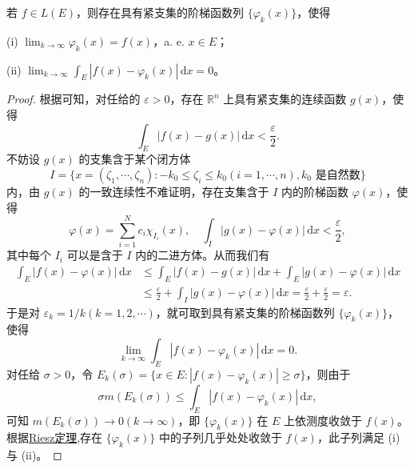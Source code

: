 \documentclass[../../main.tex]{subfiles}
\begin{document}
\begin{corollary}\label{corollary:推论4.22}
若 \( f \in L(E) \)，则存在具有紧支集的阶梯函数列 \( \{\varphi_k(x)\} \)，使得

(i) \( \lim_{k \to \infty} \varphi_k(x) = f(x) \)，a. e. \( x \in E \)；

(ii) \( \lim_{k \to \infty} \int_E |f(x) - \varphi_k(x)| \, \mathrm{d}x = 0 \)。
\end{corollary}
\begin{proof}
根据可知，对任给的 \( \varepsilon > 0 \)，存在 \( \mathbb{R}^n \) 上具有紧支集的连续函数 \( g(x) \)，使得
\[
\int_E |f(x) - g(x)| \, \mathrm{d}x < \frac{\varepsilon}{2}.
\]
不妨设 \( g(x) \) 的支集含于某个闭方体
\[
I = \{ x = (\zeta_1, \cdots, \zeta_n) : -k_0 \leqslant \zeta_i \leqslant k_0 (i = 1, \cdots, n), k_0 \text{ 是自然数} \}
\]
内，由 \( g(x) \) 的一致连续性不难证明，存在支集含于 \( I \) 内的阶梯函数 \( \varphi(x) \)，使得
\[
\varphi(x) = \sum_{i=1}^N c_i \chi_{I_i}(x), \quad \int_I |g(x) - \varphi(x)| \, \mathrm{d}x < \frac{\varepsilon}{2},
\]
其中每个 \( I_i \) 可以是含于 \( I \) 内的二进方体。从而我们有
\begin{align*}
\int_E |f(x) - \varphi(x)| \, \mathrm{d}x &\leqslant \int_E |f(x) - g(x)| \, \mathrm{d}x + \int_E |g(x) - \varphi(x)| \, \mathrm{d}x \\
&\leqslant \frac{\varepsilon}{2} + \int_I |g(x) - \varphi(x)| \, \mathrm{d}x = \frac{\varepsilon}{2} + \frac{\varepsilon}{2} = \varepsilon.
\end{align*}
于是对 \( \varepsilon_k = 1/k (k = 1, 2, \cdots) \)，就可取到具有紧支集的阶梯函数列 \( \{\varphi_k(x)\} \)，使得
\[
\lim_{k \to \infty} \int_E |f(x) - \varphi_k(x)| \, \mathrm{d}x = 0.
\]
对任给 \( \sigma > 0 \)，令 \( E_k(\sigma) = \{ x \in E : |f(x) - \varphi_k(x)| \geqslant \sigma \} \)，则由于
\[
\sigma m(E_k(\sigma)) \leqslant \int_E |f(x) - \varphi_k(x)| \, \mathrm{d}x,
\]
可知 \( m(E_k(\sigma)) \to 0 (k \to \infty) \)，即 \( \{\varphi_k(x)\} \) 在 \( E \) 上依测度收敛于 \( f(x) \)。
根据\hyperref[theorem:Riesz定理]{Riesz定理},存在 \( \{\varphi_k(x)\} \) 中的子列几乎处处收敛于 \( f(x) \)，此子列满足 (i) 与 (ii)。

\end{proof}
\end{document}
